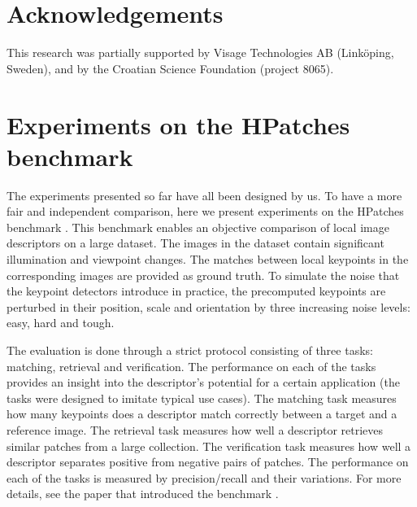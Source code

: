 \documentclass[10pt,conference,a4paper]{IEEEtran}
\begin{document}
	\section*{Acknowledgements}
	This research was partially supported by Visage Technologies AB (Link\"oping, Sweden), and by the Croatian Science Foundation (project 8065).

	
	

	\newpage
	\section*{Experiments on the HPatches benchmark}
		The experiments presented so far have all been designed by us.
		To have a more fair and independent comparison, here we present experiments on the HPatches benchmark \cite{hpatches}.
		This benchmark enables an objective comparison of local image descriptors on a large dataset.
		The images in the dataset contain significant illumination and viewpoint changes.
		The matches between local keypoints in the corresponding images are provided as ground truth.
		To simulate the noise that the keypoint detectors introduce in practice, the precomputed keypoints are perturbed in their position, scale and orientation by three increasing noise levels:
		easy, hard and tough.

		The evaluation is done through a strict protocol consisting of three tasks: matching, retrieval and verification.
		The performance on each of the tasks provides an insight into the descriptor's potential for a certain application
		(the tasks were designed to imitate typical use cases).
		The matching task measures how many keypoints does a descriptor match correctly between a target and a reference image.
		The retrieval task measures how well a descriptor retrieves similar patches from a large collection.
		The verification task measures how well a descriptor separates positive from negative pairs of patches.
		The performance on each of the tasks is measured by precision/recall and their variations.
		For more details, see the paper that introduced the benchmark \cite{hpatches}.
\end{document}
